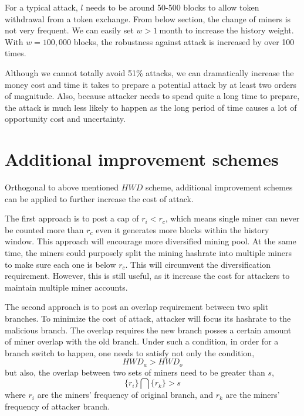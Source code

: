 \documentclass[conference]{IEEEtran}
\begin{document}
For a typical attack, $l$ needs to be around 50-500 blocks to allow token withdrawal from a token exchange. From below section, the change of miners is not very frequent. We can easily set $w > 1\ \text{month}$ to increase the history weight. With $w = 100,000$ blocks, the robustness against attack is increased by over 100 times. 

Although we cannot totally avoid 51\% attacks, we can dramatically increase the money cost and time it takes to prepare a potential attack by at least two orders of magnitude. Also, because attacker needs to spend quite a long time to prepare, the attack is much less likely to happen as the long period of time causes a lot of opportunity cost and uncertainty.  


\section{Additional improvement schemes}

Orthogonal to above mentioned ${H\!W\!D}$ scheme, additional improvement schemes can be applied to further increase the cost of attack. 

The first approach is to post a cap of $r_i < r_c$, which means single miner can never be counted more than $r_c$ even it generates more blocks within the history window. This approach will encourage more diversified mining pool. At the same time, the miners could purposely split the mining hashrate into multiple miners to make sure each one is below $r_c$. This will circumvent the diversification requirement. However, this is still useful, as it increase the cost for attackers to maintain multiple miner accounts. 


The second approach is to post an overlap requirement between two split branches. To minimize the cost of attack, attacker will focus its hashrate to the malicious branch. The overlap requires the new branch posses a certain amount of miner overlap with the old branch. Under such a condition, in order for a branch switch to happen, one needs to satisfy not only the  condition,
\begin{equation}
    H\!W\!D_a>H\!W\!D_o\label{eq_hwd_ineq}
\end{equation} 
but also, the overlap between two sets of miners need to be greater than $s$,
\begin{equation}
    \{r_i\}\bigcap\{r_k\}>s\label{eq_overlap}
\end{equation}
where $r_i$ are the miners' frequency of original branch, and $r_k$ are the miners' frequency of attacker branch. 
\end{document}
